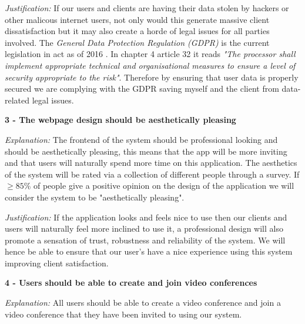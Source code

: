 \vspace{0.1cm}

\textit{Justification:}
If our users and clients are having their data stolen by
hackers or other malicous internet users, not only would this 
generate massive client dissatisfaction but it may also create
a horde of legal issues for all parties involved. The 
\textit{General Data Protection Regulation (GDPR)} is the
current legislation in act as of 2016 \cite{gdpr}. In chapter 4 
article 32 it reads \textit{"The processor shall implement
appropriate technical and organisational measures to ensure
a level of security appropriate to the risk"}. Therefore by 
ensuring that user data is properly secured we are complying 
with the GDPR saving myself and the client from data-related
legal issues.

\vspace{0.2cm}

\textsf{\bfseries 3 - The webpage design should be aesthetically
pleasing}

\vspace{0.1cm}

\textit{Explanation:} 
The frontend of the system should be professional looking and
should be aesthetically pleasing, this means that the app
will be more inviting and that users will naturally spend more
time on this application. The aesthetics of the system will be
rated via a collection of different people through a survey.
If $\geq 85\%$ of people give a positive opinion on the 
design of the application we will consider the system to be 
"aesthetically pleasing".

\vspace{0.1cm}

\textit{Justification:}
If the application looks and feels nice to use then our 
clients and users will naturally feel more inclined to use it,
a professional design will also promote a sensation of trust,
robustness and reliability of the system. We will hence be
able to ensure that our user's have a nice experience using 
this system improving client satisfaction.

\vspace{0.2cm}

\textsf{\bfseries 4 - Users should be able to create and 
join video conferences}


\vspace{0.1cm}

\textit{Explanation:}
All users should be able to create a video conference and
join a video conference that they have been invited to 
using our system.

